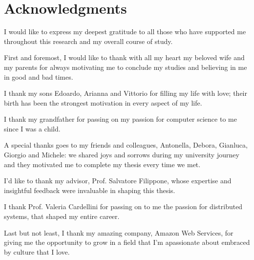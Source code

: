 


\chapter*{Acknowledgments}

I would like to express my deepest gratitude to all those who have supported me throughout this research and my overall course of study.

First and foremost, I would like to thank with all my heart my beloved wife and my parents for always motivating me to conclude my studies and believing in me in good and bad times.

I thank my sons Edoardo, Arianna and Vittorio for filling my life with love; their birth has been the strongest motivation in every aspect of my life.

I thank my grandfather for passing on my passion for computer science to me since I was a child.

A special thanks goes to my friends and colleagues, Antonella, Debora, Gianluca, Giorgio and Michele: we shared joys and sorrows during my university journey and they motivated me to complete my thesis every time we met.

I'd like to thank my advisor, Prof. Salvatore Filippone, whose expertise and insightful feedback were invaluable in shaping this thesis.

I thank Prof. Valeria Cardellini for passing on to me the passion for distributed systems, that shaped my entire career.

Last but not least, I thank my amazing company, Amazon Web Services, for giving me the opportunity to grow in a field that I'm apassionate about embraced by culture that I love.
